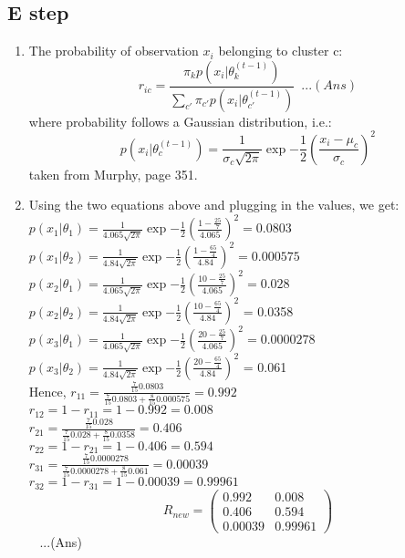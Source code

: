 \documentclass[letterpaper]{article}
\begin{document}
	\subsection*{E step}
	\begin{enumerate}
		\item The probability of observation $x_i$ belonging to cluster c:
		\begin{equation}
			r_{ic} = \frac{\pi_kp(x_i|\theta_k^{(t-1)})}{\sum_{c'}{\pi_{c'}p(x_i|\theta_{c'}^{(t-1)})}} \,\,\, ...(Ans)
		\end{equation}
		where probability follows a Gaussian distribution, i.e.:
		\begin{equation}
			p(x_i|\theta_c^{(t-1)}) = \frac{1}{\sigma_c\sqrt{2\pi}}\exp{-\frac{1}{2}(\frac{x_i - \mu_c}{\sigma_c})^2}
		\end{equation}
		taken from Murphy, page 351.
		\item
		Using the two equations above and plugging in the values, we get: \\
		$p(x_1|\theta_1) = \frac{1}{4.065\sqrt{2\pi}}\exp{-\frac{1}{2}(\frac{1 - \frac{25}{7}}{4.065})^2} = 0.0803$\\
		$p(x_1|\theta_2) = \frac{1}{4.84\sqrt{2\pi}}\exp{-\frac{1}{2}(\frac{1 - \frac{65}{4}}{4.84})^2} = 0.000575$\\
		$p(x_2|\theta_1) = \frac{1}{4.065\sqrt{2\pi}}\exp{-\frac{1}{2}(\frac{10 - \frac{25}{7}}{4.065})^2} = 0.028$\\
		$p(x_2|\theta_2) = \frac{1}{4.84\sqrt{2\pi}}\exp{-\frac{1}{2}(\frac{10 - \frac{65}{4}}{4.84})^2}$ = 0.0358\\
		$p(x_3|\theta_1) = \frac{1}{4.065\sqrt{2\pi}}\exp{-\frac{1}{2}(\frac{20 - \frac{25}{7}}{4.065})^2} = 0.0000278$\\
		$p(x_3|\theta_2) = \frac{1}{4.84\sqrt{2\pi}}\exp{-\frac{1}{2}(\frac{20 - \frac{65}{4}}{4.84})^2}$ = 0.061\\
		
		Hence, 
		$r_{11} = \frac{\frac{7}{15}0.0803}{\frac{7}{15}0.0803 + \frac{8}{15}0.000575} = 0.992$\\
		$r_{12} = 1 - r_{11} = 1 - 0.992  = 0.008$\\
		$r_{21} = \frac{\frac{7}{15}0.028}{\frac{7}{15}0.028 + \frac{8}{15}0.0358} = 0.406$\\
		$r_{22} = 1 - r_{21} = 1 - 0.406  = 0.594$\\
		$r_{31} = \frac{\frac{7}{15}0.0000278}{\frac{7}{15}0.0000278 + \frac{8}{15}0.061} = 0.00039$\\
		$r_{32} = 1 - r_{31} = 1 - 0.00039  = 0.99961$\\
		
		\[ R_{new} = \left( \begin{array}{cc}
			0.992 & 0.008 \\
			0.406 & 0.594 \\
			0.00039 & 0.99961 \end{array} \right)\]  \,\,\, ...(Ans)
		
	\end{enumerate}
\end{document}

